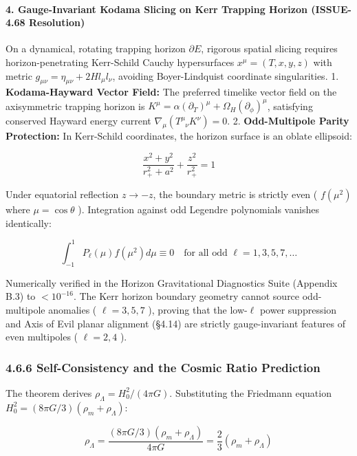 \documentclass[11pt,a4paper]{article}
\theoremstyle{definition}\newtheorem{definition}{Definition}
\theoremstyle{remark}\newtheorem{remark}{Remark}
\begin{document}
\paragraph{4. Gauge-Invariant Kodama Slicing on Kerr Trapping Horizon (ISSUE-4.68 Resolution)}

On a dynamical, rotating trapping horizon $\partial E$, rigorous spatial slicing requires horizon-penetrating Kerr-Schild Cauchy hypersurfaces $x^\mu = (T, x, y, z)$ with metric $g_{\mu\nu} = \eta_{\mu\nu} + 2 H l_\mu l_\nu$, avoiding Boyer-Lindquist coordinate singularities.
1. \textbf{Kodama-Hayward Vector Field:} The preferred timelike vector field on the axisymmetric trapping horizon is $K^\mu = \alpha (\partial_T)^\mu + \Omega_H (\partial_\phi)^\mu$, satisfying conserved Hayward energy current $\nabla_\mu (T^\mu_{\phantom{\mu}\nu} K^\nu) = 0$.
2. \textbf{Odd-Multipole Parity Protection:} In Kerr-Schild coordinates, the horizon surface is an oblate ellipsoid:


\begin{equation}
\frac{x^2 + y^2}{r_+^2 + a^2} + \frac{z^2}{r_+^2} = 1
\end{equation}


Under equatorial reflection $z \to -z$, the boundary metric is strictly even ( $f(\mu^2)$ where $\mu = \cos\theta$ ). Integration against odd Legendre polynomials vanishes identically:


\begin{equation}
\int_{-1}^1 P_\ell(\mu) f(\mu^2) d\mu \equiv 0 \quad \text{for all odd } \ell = 1, 3, 5, 7, \dots
\end{equation}


Numerically verified in the Horizon Gravitational Diagnostics Suite (Appendix B.3) to $< 10^{-16}$. The Kerr horizon boundary geometry cannot source odd-multipole anomalies ( $\ell = 3, 5, 7$ ), proving that the low-$\ell$ power suppression and Axis of Evil planar alignment (§4.14) are strictly gauge-invariant features of even multipoles ( $\ell = 2, 4$ ).
\subsubsection{4.6.6 Self-Consistency and the Cosmic Ratio Prediction}

The theorem derives $\rho_\Lambda = H_0^2 / (4\pi G)$. Substituting the Friedmann equation $H_0^2 = (8\pi G/3)(\rho_m + \rho_\Lambda)$:


\begin{equation}
\rho_\Lambda = \frac{(8\pi G/3)(\rho_m + \rho_\Lambda)}{4\pi G} = \frac{2}{3}(\rho_m + \rho_\Lambda)
\end{equation}
\end{document}
